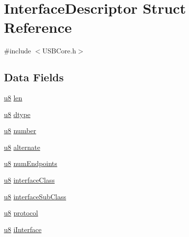 \hypertarget{struct_interface_descriptor}{}\section{Interface\+Descriptor Struct Reference}
\label{struct_interface_descriptor}


{\ttfamily \#include $<$U\+S\+B\+Core.\+h$>$}

\subsection*{Data Fields}
\begin{DoxyCompactItemize}
\item 
\hyperlink{_u_s_b_a_p_i_8h_aed742c436da53c1080638ce6ef7d13de}{u8} \hyperlink{struct_interface_descriptor_afbf3f3230446569534d5f466aaf4c23b}{len}
\item 
\hyperlink{_u_s_b_a_p_i_8h_aed742c436da53c1080638ce6ef7d13de}{u8} \hyperlink{struct_interface_descriptor_a0bb419531ec75697e63e9109fecf81b0}{dtype}
\item 
\hyperlink{_u_s_b_a_p_i_8h_aed742c436da53c1080638ce6ef7d13de}{u8} \hyperlink{struct_interface_descriptor_a19a3a72d0e5c2ae75bee1ef63637c9e6}{number}
\item 
\hyperlink{_u_s_b_a_p_i_8h_aed742c436da53c1080638ce6ef7d13de}{u8} \hyperlink{struct_interface_descriptor_a8b2cf5542b22d4c9ae79dfe6f7cd6d11}{alternate}
\item 
\hyperlink{_u_s_b_a_p_i_8h_aed742c436da53c1080638ce6ef7d13de}{u8} \hyperlink{struct_interface_descriptor_afe8ecc909a70e40b9aaf4423fb495678}{num\+Endpoints}
\item 
\hyperlink{_u_s_b_a_p_i_8h_aed742c436da53c1080638ce6ef7d13de}{u8} \hyperlink{struct_interface_descriptor_ac54ccb285d7fbe7c6516d4ca1a46d51c}{interface\+Class}
\item 
\hyperlink{_u_s_b_a_p_i_8h_aed742c436da53c1080638ce6ef7d13de}{u8} \hyperlink{struct_interface_descriptor_a9f321d6e124ddf0beadced607fb9208a}{interface\+Sub\+Class}
\item 
\hyperlink{_u_s_b_a_p_i_8h_aed742c436da53c1080638ce6ef7d13de}{u8} \hyperlink{struct_interface_descriptor_a7354e97cb32f39427d6195c914ee2abd}{protocol}
\item 
\hyperlink{_u_s_b_a_p_i_8h_aed742c436da53c1080638ce6ef7d13de}{u8} \hyperlink{struct_interface_descriptor_a08ba0e1160648c2e45d24d1f00484466}{i\+Interface}
\end{DoxyCompactItemize}



